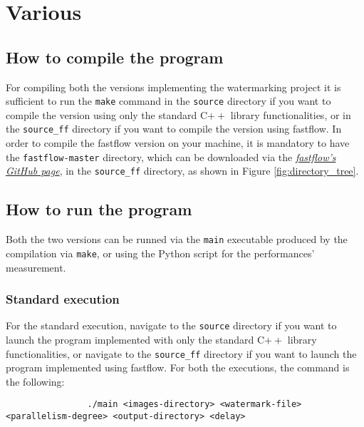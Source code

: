 \chapter{Various} %
\label{cha:various}
    \section{How to compile the program} %
    \label{sec:how_to_compile_the_program}
        For compiling both the versions implementing the watermarking project it is sufficient to run the
        \texttt{make} command in the \texttt{source} directory if you want to compile the version using only the
        standard C$++$ library functionalities, or in the \texttt{source\_ff} directory if you want to compile
        the version using fastflow. In order to compile the fastflow version on your machine, it is mandatory
        to have the \texttt{fastflow-master} directory, which can be downloaded via the
        \href{https://github.com/fastflow/fastflow}{\textit{fastflow's GitHub page}}, in the \texttt{source\_ff}
        directory, as shown in Figure \ref{fig:directory_tree}.
    \section{How to run the program} %
    \label{sec:how_to_run_the_program}
        Both the two versions can be runned via the \texttt{main} executable produced by the
        compilation via \texttt{make}, or using the Python script for the performances' measurement.
        \subsection{Standard execution} %
        \label{sub:standard_execution}
            For the standard execution, navigate to the \texttt{source} directory if you want to launch the
            program implemented with only the standard C$++$ library functionalities, or navigate to the
            \texttt{source\_ff} directory if you want to launch the program implemented using fastflow.
            For both the executions, the command is the following:

            \begin{verbatim}
                ./main <images-directory> <watermark-file> <parallelism-degree> <output-directory> <delay>
            \end{verbatim}

